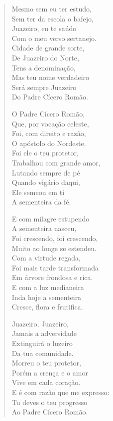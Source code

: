 \begin{verse}
Mesmo sem eu ter estudo,\\
Sem ter da escola o bafejo,\\
Juazeiro, eu te saúdo\\
Com o meu verso sertanejo.\\
Cidade de grande sorte,\\
De Juazeiro do Norte,\\
Tens a denominação,\\
Mas teu nome verdadeiro\\
Será sempre Juazeiro\\
Do Padre Cícero Romão.

O Padre Cícero Romão,\\
Que, por vocação celeste,\\
Foi, com direito e razão,\\
O apóstolo do Nordeste.\\
Foi ele o teu protetor,\\
Trabalhou com grande amor,\\
Lutando sempre de pé\\
Quando vigário daqui,\\
Ele semeou em ti\\
A sementeira da fé.

E com milagre estupendo\\
A sementeira nasceu,\\
Foi crescendo, foi crescendo,\\
Muito ao longe se estendeu.\\
Com a virtude regada,\\
Foi mais tarde transformada\\
Em árvore frondosa e rica.\\
E com a luz medianeira\\
Inda hoje a sementeira\\
Cresce, flora e frutifica.

Juazeiro, Juazeiro,\\
Jamais a adversidade\\
Extinguirá o luzeiro\\
Da tua comunidade.\\
Morreu o teu protetor,\\
Porém a crença e o amor\\
Vive em cada coração.\\
E é com razão que me expresso:\\
Tu deves o teu progresso\\
Ao Padre Cícero Romão.


\end{verse}
